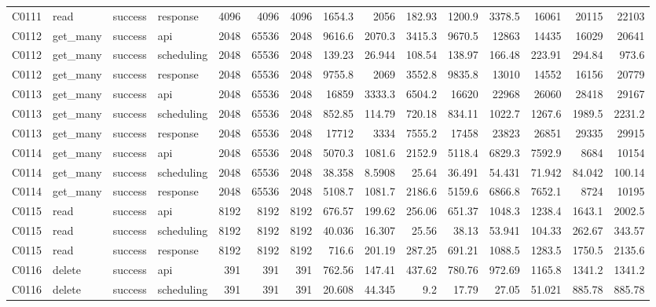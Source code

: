 \begin{landscape}
\begin{longtable}{llllrrrrrrrrrrr}
C0111 & read & success & response & 4096 & 4096 & 4096 & 1654.3 & 2056 & 182.93 & 1200.9 & 3378.5 & 16061 & 20115 & 22103\\
C0112 & get\_\allowbreak{}many & success & api & 2048 & 65536 & 2048 & 9616.6 & 2070.3 & 3415.3 & 9670.5 & 12863 & 14435 & 16029 & 20641\\
C0112 & get\_\allowbreak{}many & success & scheduling & 2048 & 65536 & 2048 & 139.23 & 26.944 & 108.54 & 138.97 & 166.48 & 223.91 & 294.84 & 973.6\\
C0112 & get\_\allowbreak{}many & success & response & 2048 & 65536 & 2048 & 9755.8 & 2069 & 3552.8 & 9835.8 & 13010 & 14552 & 16156 & 20779\\
C0113 & get\_\allowbreak{}many & success & api & 2048 & 65536 & 2048 & 16859 & 3333.3 & 6504.2 & 16620 & 22968 & 26060 & 28418 & 29167\\
C0113 & get\_\allowbreak{}many & success & scheduling & 2048 & 65536 & 2048 & 852.85 & 114.79 & 720.18 & 834.11 & 1022.7 & 1267.6 & 1989.5 & 2231.2\\
C0113 & get\_\allowbreak{}many & success & response & 2048 & 65536 & 2048 & 17712 & 3334 & 7555.2 & 17458 & 23823 & 26851 & 29335 & 29915\\
C0114 & get\_\allowbreak{}many & success & api & 2048 & 65536 & 2048 & 5070.3 & 1081.6 & 2152.9 & 5118.4 & 6829.3 & 7592.9 & 8684 & 10154\\
C0114 & get\_\allowbreak{}many & success & scheduling & 2048 & 65536 & 2048 & 38.358 & 8.5908 & 25.64 & 36.491 & 54.431 & 71.942 & 84.042 & 100.14\\
C0114 & get\_\allowbreak{}many & success & response & 2048 & 65536 & 2048 & 5108.7 & 1081.7 & 2186.6 & 5159.6 & 6866.8 & 7652.1 & 8724 & 10195\\
C0115 & read & success & api & 8192 & 8192 & 8192 & 676.57 & 199.62 & 256.06 & 651.37 & 1048.3 & 1238.4 & 1643.1 & 2002.5\\
C0115 & read & success & scheduling & 8192 & 8192 & 8192 & 40.036 & 16.307 & 25.56 & 38.13 & 53.941 & 104.33 & 262.67 & 343.57\\
C0115 & read & success & response & 8192 & 8192 & 8192 & 716.6 & 201.19 & 287.25 & 691.21 & 1088.5 & 1283.5 & 1750.5 & 2135.6\\
C0116 & delete & success & api & 391 & 391 & 391 & 762.56 & 147.41 & 437.62 & 780.76 & 972.69 & 1165.8 & 1341.2 & 1341.2\\
C0116 & delete & success & scheduling & 391 & 391 & 391 & 20.608 & 44.345 & 9.2 & 17.79 & 27.05 & 51.021 & 885.78 & 885.78\\

\end{longtable}
\end{landscape}
